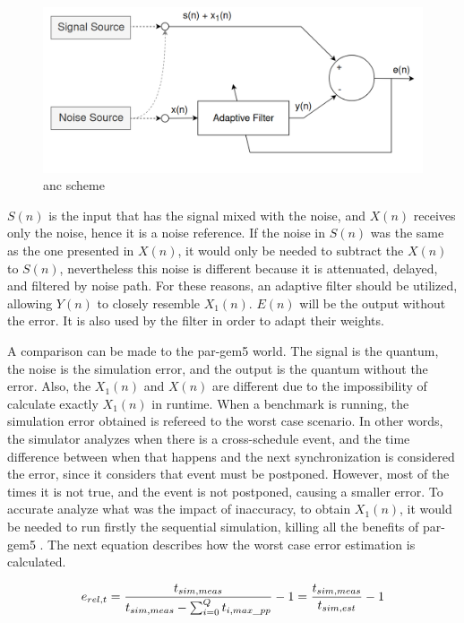 \begin{figure}[H]
	\centering
 	\includegraphics[width=0.7\linewidth]{Images/AdaptiveNoiseCancellationScheme.png}
 	\caption{\gls{anc} scheme}
	 \label{fig_AdaptiveNoiseCancellationScheme}
\end{figure}

$S(n)$ is the input that has the signal mixed with the noise, and $X(n)$ receives only the noise, hence it is a noise reference. If the noise in $S(n)$ was the same as the one presented in $X(n)$, it would only be needed to subtract the $X(n)$ to $S(n)$, nevertheless this noise is different because it is attenuated, delayed, and filtered by noise path. For these reasons, an adaptive filter should be utilized, allowing $Y(n)$ to closely resemble $X_{1}(n)$. $E(n)$ will be the output without the error. It is also used by the filter in order to adapt their weights.

A comparison can be made to the par-gem5 world. The signal is the quantum, the noise is the simulation error, and the output is the quantum without the error. Also, the $X_{1}(n)$ and $X(n)$ are different due to the impossibility of calculate exactly $X_{1}(n)$ in runtime. When a benchmark is running, the simulation error obtained is refereed to the worst case scenario. In other words, the simulator analyzes when there is a cross-schedule event, and the time difference between when that happens and the next synchronization is considered the error, since it considers that event must be postponed. However, most of the times it is not true, and the event is not postponed, causing a smaller error. To accurate analyze what was the impact of inaccuracy, to obtain $X_{1}(n)$, it would be needed to run firstly the sequential simulation, killing all the benefits of par-gem5 \cite{pargem5}. The next equation describes how the worst case error estimation is calculated. 

\begin{equation}
    \label{eq_errSim}
    \centering
        \Large
        e_{rel,t} = \frac{t_{sim,meas}}{t_{sim,meas}-\sum_{i=0}^{Q}t_{i,max\_pp}} -1  = \frac{t_{sim,meas}}{t_{sim,est}}-1
        \normalsize
\end{equation}
\vspace{0.3cm}

